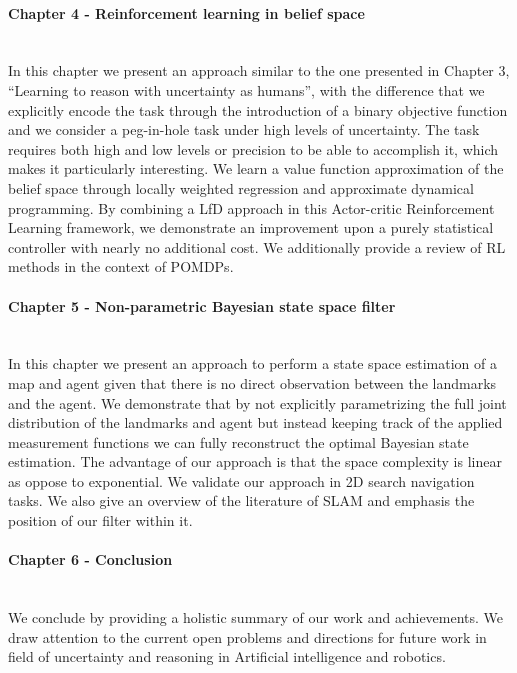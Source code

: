 \begin{minipage}[c]{0.9\textwidth}
\paragraph{Chapter 4 - Reinforcement learning in belief space}\\
In this chapter we present an approach similar to the one presented in Chapter 3, ``Learning to reason with uncertainty as humans'', with the difference that
we explicitly encode the task through the introduction of a binary objective function and we consider a peg-in-hole
task under high levels of uncertainty. The task requires both high and low levels or precision to be able to accomplish it,
which makes it particularly interesting. We learn a value function approximation of the belief space through locally weighted 
regression and approximate dynamical programming.
By combining a LfD approach in this Actor-critic Reinforcement Learning framework, we demonstrate an improvement upon 
a purely statistical controller with nearly no additional cost. 
We additionally provide a review of RL methods in the context of POMDPs.
\end{minipage}

\begin{minipage}[c]{0.9\textwidth}
\paragraph{Chapter 5 - Non-parametric Bayesian state space filter}\\
In this chapter we present an approach to perform a state space estimation of a map and agent 
given that there is no direct observation between the landmarks and the agent. We demonstrate that 
by not explicitly parametrizing the full joint distribution of the landmarks and agent but instead
keeping track of the applied measurement functions we can fully reconstruct the optimal Bayesian 
state estimation. The advantage of our approach is that the space complexity is linear as oppose 
to exponential. We validate our approach in 2D search navigation tasks.
We also give an overview of the literature of SLAM and emphasis the position of our filter within it.
\end{minipage}

\begin{minipage}[c]{0.9\textwidth}
\paragraph{Chapter 6 - Conclusion}\\
We conclude by providing a holistic summary of our work and achievements. We draw attention to the current 
open problems and directions for future work in field of uncertainty and reasoning in Artificial intelligence and robotics.
\end{minipage}







